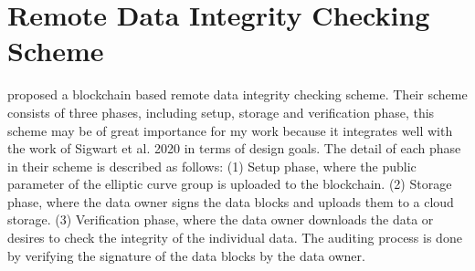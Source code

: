 \section{Remote Data Integrity Checking Scheme}
\cite{zhao2020blockchain} proposed a blockchain based remote data integrity checking scheme. Their scheme consists of three phases, including setup, storage and verification phase, this scheme may be of great importance for my work because it integrates well with the work of Sigwart et al. 2020 in terms of design goals. The detail of each phase in their scheme is described as follows: (1) Setup phase, where the public parameter of the elliptic curve group is uploaded to the blockchain. (2) Storage phase, where the data owner signs the data blocks and uploads them to a cloud storage. (3) Verification phase, where the data owner downloads the data or desires to check the integrity of the individual data. The auditing process is done by verifying the signature of the data blocks by the data owner.